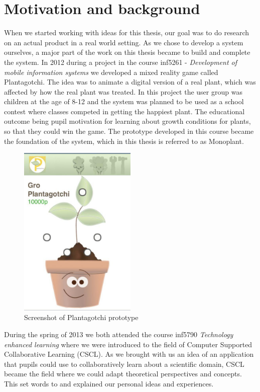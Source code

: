 \section{Motivation and background}
When we started working with ideas for this thesis, our goal was to do research on an actual product in a real world setting. As we chose to develop a system ourselves, a major part of the work on this thesis became to build and complete the system. In 2012 during a project in the course inf5261 - \emph{Development of mobile information systems} we developed a mixed reality game called Plantagotchi. The idea was to animate a digital version of a real plant, which was affected by how the real plant was treated. In this project the user group was children at the age of 8-12 and the system was planned to be used as a school contest where classes competed in getting the happiest plant. The educational outcome being pupil motivation for learning about growth conditions for plants, so that they could win the game. The prototype developed in this course became the foundation of the system, which in this thesis is referred to as Monoplant.

\begin{figure}
\centering
\includegraphics[width=0.5\textwidth]{img/introduction/plantagotchi.jpg}
\caption{Screenshot of Plantagotchi prototype}
\label{fig:scrshotplantagotchi}
\end{figure}

During the spring of 2013 we both attended the course inf5790 \emph{Technology enhanced learning} where we were introduced to the field of Computer Supported Collaborative Learning (CSCL). As we brought with us an idea of an application that pupils could use to collaboratively learn about a scientific domain, CSCL became the field where we could adapt theoretical perspectives and concepts. This set words to and explained our personal ideas and experiences. 

